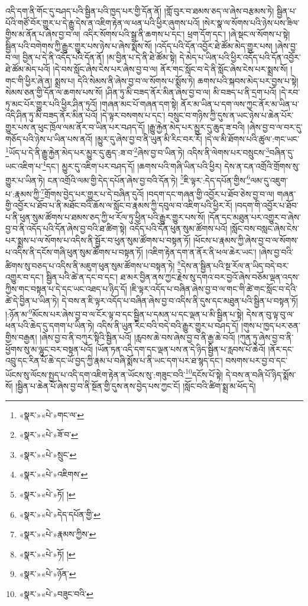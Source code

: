 འདི་དག་ནི་གོང་དུ་བཤད་པའི་སྦྱིན་པའི་ཁྱད་པར་གྱི་དོན་ནོ། །གློ་བུར་བ་ཐམས་ཅད་ལ་ཞེས་བརྩམས་ཏེ། སྦྱིན་པ་པོའི་གཙོ་བོར་གྱུར་པ་དེ་རྒྱུ་དེས་ན་འཇིག་རྟེན་ལ་ཕན་པའི་ཕྱིར་ཞུགས་པའོ། །སེར་སྣ་ལ་སོགས་པའི་ཉེས་པས་ཟིལ་གྱིས་མ་ནོན་པ་ཞེས་བྱ་བ་ལ། འདིར་སོགས་པའི་སྒྲ་ནི་ཆགས་པ་དང་། ཕྲག་དོག་དང་། །ཞེ་སྡང་ལ་སོགས་པ་སྟེ། སྦྱིན་པའི་བགེགས་ཀྱི་རྒྱུར་གྱུར་པས་ཉེས་པ་ཞེས་སྨོས་སོ། །འདོད་པའི་དོན་འབྱོར་ཐེ་ཚོམ་མེད་གྱུར་པས། །ཞེས་བྱ་བ་ལ། བྱིན་པ་དེ་ནི་འདོད་པའི་དོན་ནོ། །མ་བྱིན་པ་དེ་ནི་ཐེ་ཚོམ་སྟེ། དེ་མེད་པ་ཡིན་པའི་ཕྱིར་འདོད་པའི་དོན་འབྱོར་ཐེ་ཚོམ་མེད་པའོ། །དེ་བས་སློང་ཞེས་ངེས་པར་ཞེས་བྱ་བ་ལ། ནོར་གང་སློང་བ་དེ་ནི་སློང་ཞེས་ངེས་པར་སྨྲས་སོ། །གང་གི་ཕྱིར་ཞེ་ན། སྨྲས་པ། དེའི་སེམས་ནི་ཞེས་བྱ་བ་ལ་སོགས་པ་སྨོས་ཏེ། ཆགས་པའི་སྐབས་མེད་པར་བྱས་པ་སྟེ། སེམས་ཅན་གྱི་དོན་ལ་ཆགས་པས་སོ། །ཤིན་ཏུ་མི་བཟད་ནོར་མིན་ཞེས་བྱ་བ་ལ། མི་བཟད་པ་ནི་དྲག་པའོ། །དེ་རབ་ཏུ་མང་པོར་གྱུར་པའི་ཕྱིར་ཤིན་ཏུའོ། །གཞན་མང་པོ་གཞན་དག་སྟེ། ནོར་མ་ཡིན་པ་དག་ལས་ཀྱང་ནོར་མ་ཡིན་པ་འདི་ཤིན་ཏུ་མི་བཟད་ནོར་མིན་པའོ། །དེ་ལྟར་བསགས་པ་དང་། བསྲུང་བ་གཉིས་ཀྱི་དུས་ན་ཡང་ཉེས་པ་ཆེན་པོར་གྱུར་པས་ན་ཕུང་ཁྲོལ་ལམ་ནོར་བ་ཡིན་པར་བཤད་དོ། །རྒྱུ་རྐྱེན་མེད་པར་མྱུར་དུ་ཆུད་ཟ་བའི། །ཞེས་བྱ་བ་ལ་བར་དུ་གཅོད་པའི་ཉེས་པ་ཡིན་པས་ནའོ། །མྱུར་དུ་ཞེས་བྱ་བ་ནི་ཡུན་མི་རིང་བར་རོ། །དེ་ལ་མི་ཐོགས་པའི་ཚུལ་:གང་ཡང་\footnote{«སྣར་»«པེ་»གང་ལ་}ཡོད་པ་དེ་ནི་རྒྱུ་རྐྱེན་མེད་པར་མྱུར་དུ་ཆུད་:ཟ་བ་\footnote{«སྣར་»«པེ་»ཟོ་བ་}ཞེས་བྱ་བ་ཡིན་ཏེ། འདིས་ནི་ལེགས་པར་བསྲུངས་\footnote{«སྣར་»«པེ་»སྲུང་}བཞིན་དུ་ཡང་འཇིག་པ་\footnote{«སྣར་»«པེ་»འཇིགས་}དང་། མྱུར་དུ་འཇིག་པར་བཤད་དོ། །ཆགས་པའི་གཞི་ཡིན་པའི་ཕྱིར། དེས་ན་ངན་འགྲོའི་གྲོགས་སུ་གྱུར་པ་ཡིན་ཏེ། ངན་འགྲོའི་ལམ་གྱི་དེད་དཔོན་ཞེས་བྱ་བའི་དོན་ཏེ། \footnote{«སྣར་»«པེ་»ཏོ། ། }ཇི་ལྟར་:དེད་དཔོན་གྱིས་\footnote{«སྣར་»«པེ་»དེད་དཔོན་གྱི་}ལམ་དུ་འཇུག་པ་:རྣམས་ཀྱི་\footnote{«སྣར་»«པེ་»རྣམས་ཀྱིས་}གྲོགས་བྱེད་པར་གྱུར་པ་དེ་བཞིན་དུའོ། །བདག་དང་གཞན་གྱི་འབྱོར་པ་ཐོབ་ཅེས་བྱ་བ་ལ། གཞན་གྱི་འབྱོར་པ་ཐོབ་པ་ནི་མཐོང་བའི་ཆོས་ལ་སློང་བ་རྣམས་ཀྱི་དབུལ་བ་འཇིག་པའི་ཕྱིར་རོ། །བདག་གི་འབྱོར་པ་ཐོབ་པ་ནི་ཕུན་སུམ་ཚོགས་པ་ཐམས་ཅད་ཀྱི་ཕ་རོལ་ཏུ་ཕྱིན་པའི་རྒྱུར་གྱུར་པས་སོ། །དོན་དང་མཐུན་པར་འགྱུར་བ་ཞེས་བྱ་བ་ནི་འདོད་པའི་དོན་ཞེས་བྱ་བའི་ཐ་ཚིག་སྟེ། འདོད་པའི་དོན་ཕུན་སུམ་ཚོགས་པའོ། །སློང་བས་བསླང་ཞེས་ངེས་པར་སྨྲས་པ་ལ་སོགས་པ་འདིས་ནི་སྦྱོར་བ་ཕུན་སུམ་ཚོགས་པ་བསྟན་ཏོ། །ཕོངས་པ་རྣམས་ཀྱི་ཞེས་བྱ་བ་ལ་སོགས་པ་འདིས་ནི་དངོས་གཞི་ཕུན་སུམ་ཚོགས་པ་བསྟན་ཏོ། །འཇིག་རྟེན་དག་ན་ནོར་ནི་ཕལ་ཆེར་ཡང་། །ཞེས་བྱ་བའི་ཚིགས་སུ་བཅད་པ་འདིས་ནི་མཇུག་ཕུན་སུམ་ཚོགས་པ་བསྟན་ཏེ། \footnote{«སྣར་»«པེ་»ཏོ། ། }དེས་ན་སྦྱིན་པའི་སྔ་རོལ་ན་ཡིད་བདེ་བར་འགྱུར་བ་དང་། སྦྱིན་པའི་ཚེ་ན་དང་བ་དང་། ཐ་མར་བྱིན་ནས་ཀྱང་རྗེས་སུ་དགའ་བར་བྱའོ་ཞེས་བཅོམ་ལྡན་འདས་ཀྱིས་གང་བསྟན་པ་དེ་དང་ཡང་འཐད་པ་ཉིད་དོ། །ཇི་ལྟར་འདོད་པ་བཞིན་ཞེས་བྱ་བ་ལ་གང་གི་ཚེ་གང་སློང་བ་དེའི་ཚེ་དེ་བྱིན་པ་ཡིན་ཏེ། དེ་བས་ན་ཇི་ལྟར་འདོད་པ་བཞིན་ཞེས་བྱ་བ་འདིས་ནི་དུས་དང་མཐུན་པའི་སྦྱིན་པ་བསྟན་ཏོ། །:ཉོན་མ་\footnote{«སྣར་»«པེ་»ཉོན་}མོངས་པར་ཞེས་བྱ་བ་ལ་ངོར་ལྟ་བ་དང་སྦྱིན་པ་དམན་པ་དང་ལྡན་པ་མི་སྦྱིན་པ་སྟེ། དེས་ན་བུ་ལྟ་བུ་ལ་ཕན་པའི་ཆེད་དུ་དགག་པ་ཡིན་ཏེ། འདིས་ནི་ཡུན་རིང་བའི་བདེ་བའི་རྒྱུར་གྱུར་པ་བཤད་དོ། །གུས་པ་ཁྱད་པར་ཅན་གྱིས་བརྒྱན། །ཞེས་བྱ་བ་ནི་བཀུར་སྟིའི་སྦྱིན་པའོ། །རླབས་ཆེ་བས་ཞེས་བྱ་བ་ནི་རྒྱ་ཆེ་བའོ། །ཀུན་ཏུ་ཞེས་བྱ་བ་ནི་ཕྱོགས་སུ་མ་ལྷུང་བར་བསྟན་པའོ། །ཡོན་ཏན་འདི་དག་དང་ལྡན་པས་ན་དེ་ཉིད་སྦྱིན་པ་རླབས་པོ་ཆེའོ། །ནོར་དང་འབྲུ་དང་རིན་པོ་ཆེ་དང་ཡོ་བྱད་ཀྱི་རྣམ་པ་བཞི་སྨོས་པ་ནི་ཡང་དག་པར་ཐ་སྙད་དང་། བསགས་པར་བྱ་བ་དང་ཡོངས་སུ་ལོངས་སྤྱད་པ་འདི་དག་འཇིག་རྟེན་ན་ཡོངས་སུ་:གཟུང་བའི་\footnote{«སྣར་»«པེ་»བཟུང་བའི་}དངོས་པོ་སྟེ། དེ་བས་ན་བཞི་པོ་ཉིད་སྨོས་སོ། །སྦྱིན་པ་ཆེན་པོ་ཞེས་བྱ་བ་ནི་སྔོན་གྱི་དུས་ནས་བྱེད་པས་ཀྱང་ངོ། །སློང་བའི་ཚིག་སྨྲ་མ་ཕོད་དེ། 